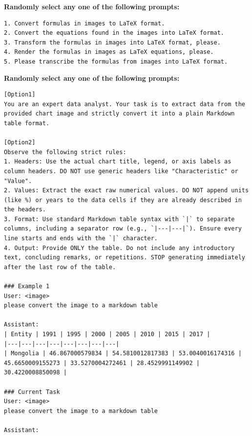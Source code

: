 \begin{tcolorbox}[
  colback=gray!5,
  colframe=gray!60,
  title={Prompt for formula2latex},
  fonttitle=\bfseries,
  breakable
]
\textbf{Randomly select any one of the following prompts:} \\
\begin{lstlisting}[style=promptlisting, breakautoindent=false, breakindent=0pt]
1. Convert formulas in images to LaTeX format.
2. Convert the equations found in the images into LaTeX format.
3. Transform the formulas in images into LaTeX format, please.
4. Render the formulas in images as LaTeX equations, please.
5. Please transcribe the formulas from images into LaTeX format.
\end{lstlisting}
\end{tcolorbox}

\begin{tcolorbox}[
  colback=gray!5,
  colframe=gray!60,
  title={Prompt for chart2table},
  fonttitle=\bfseries,
  breakable
]
\textbf{Randomly select any one of the following prompts:} \\
\begin{lstlisting}[style=promptlisting, breakautoindent=false, breakindent=0pt]
[Option1]
You are an expert data analyst. Your task is to extract data from the provided chart image and strictly convert it into a plain Markdown table format.

[Option2]
Observe the following strict rules:
1. Headers: Use the actual chart title, legend, or axis labels as column headers. DO NOT use generic headers like "Characteristic" or "Value".
2. Values: Extract the exact raw numerical values. DO NOT append units (like %) or years to the data cells if they are already described in the headers.
3. Format: Use standard Markdown table syntax with `|` to separate columns, including a separator row (e.g., `|---|---|`). Ensure every line starts and ends with the `|` character.
4. Output: Provide ONLY the table. Do not include any introductory text, concluding remarks, or repetitions. STOP generating immediately after the last row of the table.

### Example 1
User: <image>
please convert the image to a markdown table

Assistant:
| Entity | 1991 | 1995 | 2000 | 2005 | 2010 | 2015 | 2017 |
|---|---|---|---|---|---|---|---|
| Mongolia | 46.867000579834 | 54.5810012817383 | 53.0040016174316 | 45.6650009155273 | 33.5270004272461 | 28.4529991149902 | 30.4220008850098 |

### Current Task
User: <image>
please convert the image to a markdown table

Assistant:
\end{lstlisting}
\end{tcolorbox}

